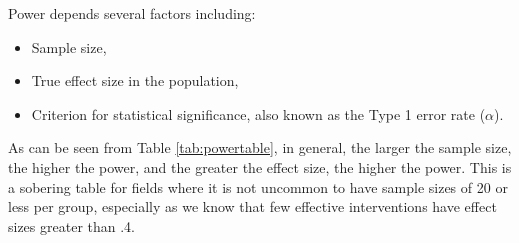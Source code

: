 \documentclass{krantz}
\providecommand{\tightlist}{%
\setlength{\itemsep}{0pt}\setlength{\parskip}{0pt}}
\begin{document}
Power depends several factors including:

\begin{itemize}
\tightlist
\item
  Sample size,
\item
  True effect size in the population,
\item
  Criterion for statistical significance, also known as the Type 1 error rate (\(\alpha\)).
\end{itemize}

As can be seen from Table \ref{tab:powertable}, in general, the larger the sample size, the higher the power, and the greater the effect size, the higher the power. This is a sobering table for fields where it is not uncommon to have sample sizes of 20 or less per group, especially as we know that few effective interventions have effect sizes greater than .4.
\end{document}
